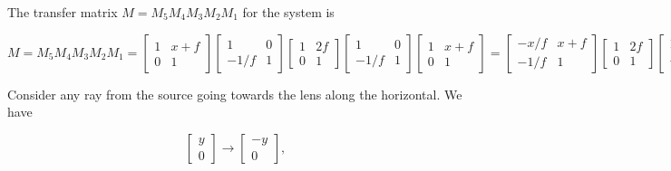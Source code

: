 {\begin{enumerate}

The transfer matrix $M = M_5 M_4 M_3 M_2 M_1$ for the system is

\begin{dmath}\label{eqn:modernOpticsProblemSet1P1:1670}
M
= M_5 M_4 M_3 M_2 M_1
=
\begin{bmatrix}
1 & x + f \\
0 & 1
\end{bmatrix}
\begin{bmatrix}
1 & 0 \\
-1/f & 1
\end{bmatrix}
\begin{bmatrix}
1 & 2 f \\
0 & 1
\end{bmatrix}
\begin{bmatrix}
1 & 0 \\
-1/f & 1
\end{bmatrix}
\begin{bmatrix}
1 & x + f \\
0 & 1
\end{bmatrix}
=
\begin{bmatrix}
-x/f & x + f \\
-1/f & 1
\end{bmatrix}
\begin{bmatrix}
1 & 2 f \\
0 & 1
\end{bmatrix}
\begin{bmatrix}
1 & x + f \\
-1/f & -x/f
\end{bmatrix}
=
\begin{bmatrix}
-x/f & -x + f \\
-1/f & -1
\end{bmatrix}
\begin{bmatrix}
1 & x + f \\
-1/f & -x/f
\end{bmatrix}
=
\begin{bmatrix}
-1 & -2 x \\
0 & -1
\end{bmatrix}.
\end{dmath}

Consider any ray from the source going towards the lens along the horizontal.  We have

\begin{dmath}\label{eqn:modernOpticsProblemSet1P1:1690}
\begin{bmatrix}
y \\
0
\end{bmatrix}
\rightarrow
\begin{bmatrix}
-y \\
0
\end{bmatrix},
\end{dmath}


\end{enumerate}}
